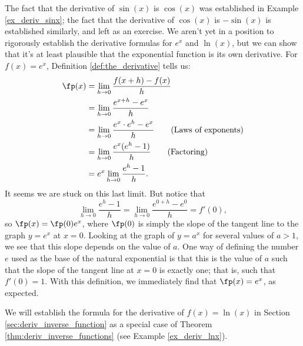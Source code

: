 The fact that the derivative of $\sin(x)$ is $\cos(x)$ was established in Example \ref{ex_deriv_sinx}; the fact that the derivative of $\cos(x)$ is $-\sin(x)$ is established similarly, and left as an exercise. We aren't yet in a position to rigorously establish the derivative formulas for $e^x$ and $\ln(x)$, but we can show that it's at least plausible that the exponential function is its own derivative. For $f(x)=e^x$, Definition \ref{def:the_derivative} tells us:
\begin{align*}
\fp(x) & = \lim_{h\to 0}\frac{f(x+h)-f(x)}{h}\\
& = \lim_{h\to 0}\frac{e^{x+h}-e^x}{h}\\
& = \lim_{h\to 0}\frac{e^x\cdot e^h - e^x}{h} \tag{Laws of exponents}\\
& = \lim_{h\to 0}\frac{e^x(e^h-1)}{h} \tag{Factoring}\\
& = e^x\lim_{h\to 0}\frac{e^h-1}{h}.
\end{align*}
It seems we are stuck on this last limit. But notice that
\[
\lim_{h\to 0}\frac{e^h-1}{h} = \lim_{h\to 0}\frac{e^{0+h}-e^0}{h} = f'(0),
\]
so $\fp(x) = \fp(0)e^x$, where $\fp(0)$ is simply the slope of the tangent line to the graph $y=e^x$ at $x=0$. Looking at the graph of $y=a^x$ for several values of $a>1$, we see that this slope depends on the value of $a$. One way of defining the number $e$ used as the base of the natural exponential is that this is the value of $a$ such that the slope of the tangent line at $x=0$ is exactly one; that is, such that $f'(0)=1$. With this definition, we immediately find that $\fp(x)=e^x$, as expected.


{We will establish the formula for the derivative of $f(x)=\ln(x)$ in Section \ref{sec:deriv_inverse_function} as a special case of Theorem \ref{thm:deriv_inverse_functions} (see Example \ref{ex_deriv_lnx}).

}

